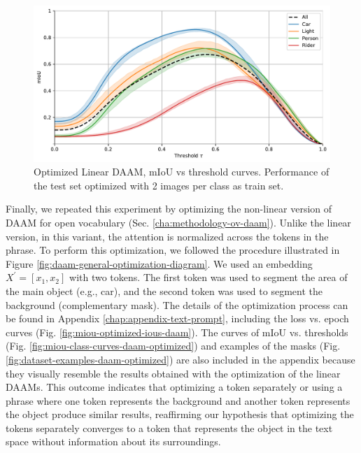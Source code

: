  \begin{figure}
    \centering
    \includegraphics[width=1\columnwidth]{img/4-experiments/heatmap-optimized-iou-2-500-test-large.pdf}
    \caption[Optimized Linear DAAM mIoU curves]{Optimized Linear DAAM, mIoU vs threshold curves. Performance of the test set optimized with 2 images per class as train set.}
    \label{fig:miou-class-curves-linear-optimized}
\end{figure}

Finally, we repeated this experiment by optimizing the non-linear version of DAAM for open vocabulary (Sec. \ref{cha:methodology-ov-daam}). Unlike the linear version, in this variant, the attention is normalized across the tokens in the phrase. To perform this optimization, we followed the procedure illustrated in Figure \ref{fig:daam-general-optimization-diagram}. We used an embedding $X^\prime = [x_1, x_2]$ with two tokens. The first token was used to segment the area of the main object (e.g., car), and the second token was used to segment the background (complementary mask). The details of the optimization process can be found in Appendix \ref{chap:appendix-text-prompt}, including the loss vs. epoch curves (Fig. \ref{fig:miou-optimized-ious-daam}). The curves of mIoU vs. thresholds (Fig. \ref{fig:miou-class-curves-daam-optimized}) and examples of the masks (Fig. \ref{fig:dataset-examples-daam-optimized}) are also included in the appendix because they visually resemble the results obtained with the optimization of the linear DAAMs. This outcome indicates that optimizing a token separately or using a phrase where one token represents the background and another token represents the object produce similar results, reaffirming our hypothesis that optimizing the tokens separately converges to a token that represents the object in the text space without information about its surroundings.

